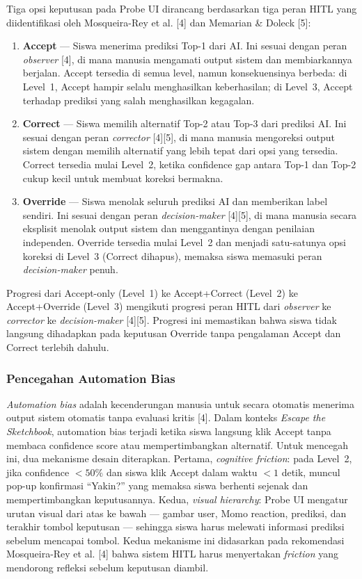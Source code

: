 \documentclass[10pt,twoside,openright]{report}
\begin{document}
Tiga opsi keputusan pada Probe UI dirancang berdasarkan tiga peran HITL yang diidentifikasi oleh Mosqueira-Rey et al. [4] dan Memarian \& Doleck [5]:

\begin{enumerate}
    \item \textbf{Accept} --- Siswa menerima prediksi Top-1 dari AI. Ini sesuai dengan peran \textit{observer} [4], di mana manusia mengamati output sistem dan membiarkannya berjalan. Accept tersedia di semua level, namun konsekuensinya berbeda: di Level~1, Accept hampir selalu menghasilkan keberhasilan; di Level~3, Accept terhadap prediksi yang salah menghasilkan kegagalan.
    \item \textbf{Correct} --- Siswa memilih alternatif Top-2 atau Top-3 dari prediksi AI. Ini sesuai dengan peran \textit{corrector} [4][5], di mana manusia mengoreksi output sistem dengan memilih alternatif yang lebih tepat dari opsi yang tersedia. Correct tersedia mulai Level~2, ketika confidence gap antara Top-1 dan Top-2 cukup kecil untuk membuat koreksi bermakna.
    \item \textbf{Override} --- Siswa menolak seluruh prediksi AI dan memberikan label sendiri. Ini sesuai dengan peran \textit{decision-maker} [4][5], di mana manusia secara eksplisit menolak output sistem dan menggantinya dengan penilaian independen. Override tersedia mulai Level~2 dan menjadi satu-satunya opsi koreksi di Level~3 (Correct dihapus), memaksa siswa memasuki peran \textit{decision-maker} penuh.
\end{enumerate}

Progresi dari Accept-only (Level~1) ke Accept+Correct (Level~2) ke Accept+Override (Level~3) mengikuti progresi peran HITL dari \textit{observer} ke \textit{corrector} ke \textit{decision-maker} [4][5]. Progresi ini memastikan bahwa siswa tidak langsung dihadapkan pada keputusan Override tanpa pengalaman Accept dan Correct terlebih dahulu.

\subsubsection{Pencegahan Automation Bias}

\textit{Automation bias} adalah kecenderungan manusia untuk secara otomatis menerima output sistem otomatis tanpa evaluasi kritis [4]. Dalam konteks \textit{Escape the Sketchbook}, automation bias terjadi ketika siswa langsung klik Accept tanpa membaca confidence score atau mempertimbangkan alternatif. Untuk mencegah ini, dua mekanisme desain diterapkan. Pertama, \textit{cognitive friction}: pada Level~2, jika confidence $< 50\%$ dan siswa klik Accept dalam waktu $< 1$ detik, muncul pop-up konfirmasi ``Yakin?'' yang memaksa siswa berhenti sejenak dan mempertimbangkan keputusannya. Kedua, \textit{visual hierarchy}: Probe UI mengatur urutan visual dari atas ke bawah --- gambar user, Momo reaction, prediksi, dan terakhir tombol keputusan --- sehingga siswa harus melewati informasi prediksi sebelum mencapai tombol. Kedua mekanisme ini didasarkan pada rekomendasi Mosqueira-Rey et al. [4] bahwa sistem HITL harus menyertakan \textit{friction} yang mendorong refleksi sebelum keputusan diambil.
\end{document}
